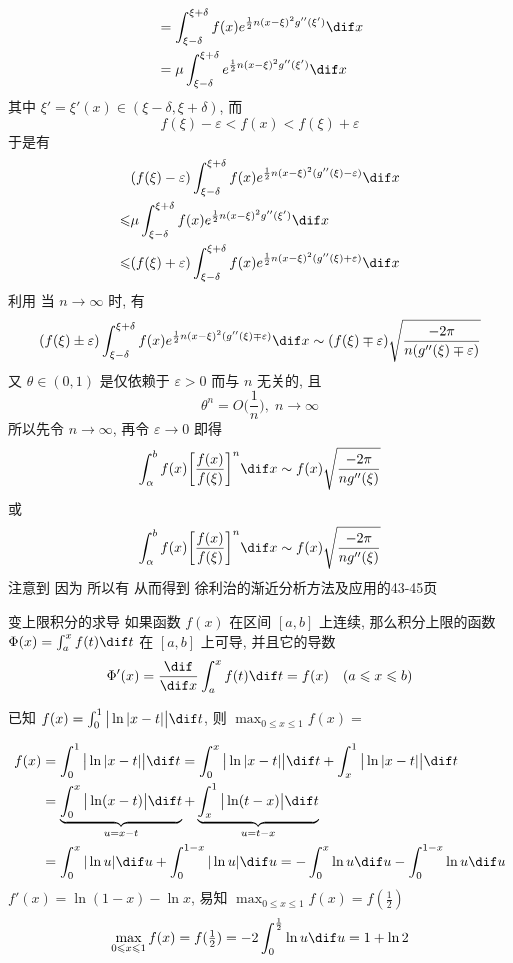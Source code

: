 \documentclass[color=green,titlestyle=hang]{elegantbook}%
\begin{document}
\begin{newproof}
\begin{align*}
&=\int_{\xi-\delta}^{\xi+\delta}f(x)e^{\frac{1}{2}n(x-\xi)^2g''(\xi')}\dif x\\
&=\mu\int_{\xi-\delta}^{\xi+\delta}e^{\frac{1}{2}n(x-\xi)^2g''(\xi')}\dif x
\end{align*}
其中 $\xi'=\xi'(x)\in(\xi-\delta,\xi+\delta)$, 而
\[f(\xi)-\varepsilon<f(x)<f(\xi)+\varepsilon\]
于是有
\begin{align*}
&(f(\xi)-\varepsilon)\int_{\xi-\delta}^{\xi+\delta}f(x)e^{\frac{1}{2}n(x-\xi)^2(g''(\xi)-\varepsilon)}\dif x\\
\leqslant& \mu\int_{\xi-\delta}^{\xi+\delta}f(x)e^{\frac{1}{2}n(x-\xi)^2g''(\xi')}\dif x\\
\leqslant&(f(\xi)+\varepsilon)\int_{\xi-\delta}^{\xi+\delta}f(x)e^{\frac{1}{2}n(x-\xi)^2(g''(\xi)+\varepsilon)}\dif x
\end{align*}
利用  当 $n\to\infty$ 时, 有
\[(f(\xi)\pm\varepsilon)\int_{\xi-\delta}^{\xi+\delta}f(x)e^{\frac{1}{2}n(x-\xi)^2(g''(\xi)\mp\varepsilon)}\dif x\sim(f(\xi)\mp\varepsilon)\sqrt{\frac{-2\pi}{n(g''(\xi)\mp\varepsilon)}}\]
又 $\theta\in(0,1)$ 是仅依赖于 $\varepsilon>0$ 而与 $n$ 无关的, 且
\[\theta^n=O\Big(\frac{1}{n}\Big),\;n\to\infty \]
所以先令 $n\to\infty$, 再令 $\varepsilon\to0$ 即得
\[\int_{\alpha}^bf(x)\bigg[\frac{f(x)}{f(\xi)}\bigg]^n\dif x\sim f(x)\sqrt{\frac{-2\pi}{ng''(\xi)}} \]
或\[\int_{\alpha}^bf(x)\bigg[\frac{f(x)}{f(\xi)}\bigg]^n\dif x\sim f(x)\sqrt{\frac{-2\pi}{ng''(\xi)}} \]
注意到
因为  所以有
从而得到
徐利治的渐近分析方法及应用的43-45页	
\end{newproof}

\begin{theorem}{变上限积分的求导}{}
如果函数 $f(x)$ 在区间 $[a,b]$ 上连续, 那么积分上限的函数 $\Phi(x)=\int_a^xf(t)\dif t$ 在 $[a,b]$ 上可导, 并且它的导数
\[\Phi'(x)=\frac{\dif}{\dif x}\int_a^xf(t)\dif t=f(x)\quad(a\leqslant x\leqslant b) \]
\end{theorem}

\begin{example}
已知 $f(x)=\int_0^1\big|\ln|x-t|\big|\dif t$, 则 $\max_{0\leqslant x\leqslant1}f(x)=$
\end{example}\begin{solution}
\begin{align*}
f(x)&=\int_0^1\big|\ln|x-t|\big|\dif t=\int_0^x\big|\ln|x-t|\big|\dif t+\int_x^1\big|\ln|x-t|\big|\dif t\\
&=\underbrace{\int_0^x\big|\ln(x-t)\big|\dif t}_{u=x-t}+\underbrace{\int_x^1\big|\ln(t-x)\big|\dif t}_{u=t-x}\\
&=\int_0^x|\ln u|\dif u+\int_0^{1-x}|\ln u|\dif u=-\int_0^x\ln u\dif u-\int_0^{1-x}\ln u\dif u
\end{align*}
$f'(x)=\ln(1-x)-\ln x$, 易知 $\max_{0\leqslant x\leqslant1}f(x)=f(\tfrac{1}{2})$
\[\max_{0\leqslant x\leqslant1}f(x)=f(\tfrac{1}{2})=-2\int_0^{\frac{1}{2}}\ln u\dif u=1+\ln2\]
\end{solution}
\end{document}
